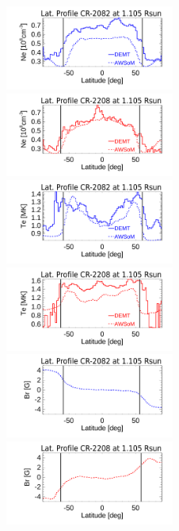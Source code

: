 \documentclass[namedreferences]{solarphysics}
\begin{document}
\begin{article}
\begin{figure}[h!]
\begin{center}
\includegraphics[width=0.495\textwidth]{figs/Perfil_Ne_demt_awsom_2082_1105_2.pdf}
\includegraphics[width=0.495\textwidth]{figs/Perfil_Ne_demt_awsom_2208_1105_2.pdf}
\includegraphics[width=0.495\textwidth]{figs/Perfil_Te_demt_awsom_2082_1105_2.pdf}
\includegraphics[width=0.495\textwidth]{figs/Perfil_Te_demt_awsom_2208_1105_2.pdf}
\includegraphics[width=0.495\textwidth]{figs/Perfil_Br_2082_1105_2.pdf}
\includegraphics[width=0.495\textwidth]{figs/Perfil_Br_2208_1105_2.pdf}

\end{center}
\end{figure}
\end{article}
\end{document}
